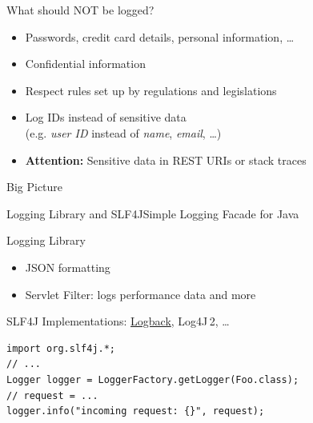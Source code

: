\begin{frame}{What should NOT be logged?}
    \begin{itemize}
        \item Passwords, credit card details, personal information, \ldots{}
        \item Confidential information
        \item Respect rules set up by regulations and legislations
        \item Log IDs instead of sensitive data\\(e.g. \textit{user ID} instead of \textit{name}, \textit{email}, \ldots)
        \item \textbf{Attention:} Sensitive data in REST URIs or stack traces
    \end{itemize}

    \vfill
\end{frame}

\begin{frame}{Big Picture}
\centerline{
}
\end{frame}

\begin{frame}[fragile]{Logging Library and SLF4J}{Simple Logging Facade for Java}
	\begin{block}{Logging Library}
	    \begin{itemize}
	        \item JSON formatting
	        \item Servlet Filter: logs performance data and more
	    \end{itemize}
    \end{block}

    SLF4J Implementations: \underline{Logback}, Log4J\,2, \ldots{}

    \vfill

    \begin{lstlisting}
import org.slf4j.*;
// ...
Logger logger = LoggerFactory.getLogger(Foo.class);
// request = ...
logger.info("incoming request: {}", request);
    \end{lstlisting}
\end{frame}

